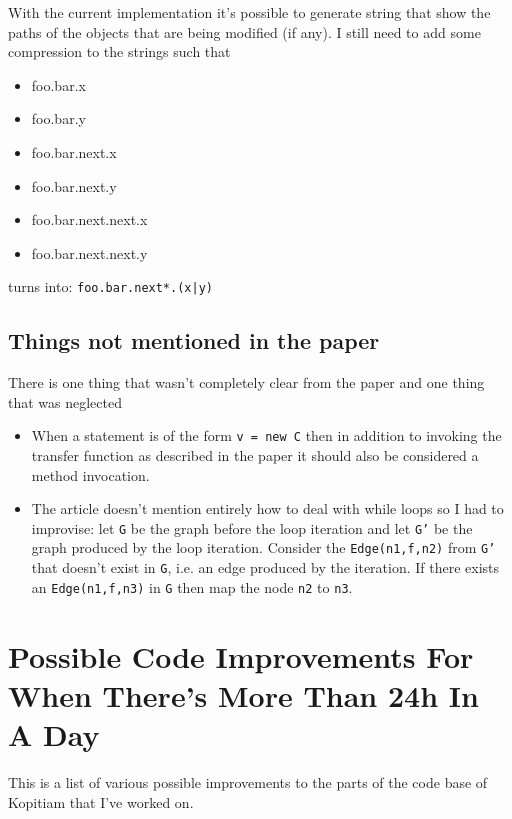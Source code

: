 \documentclass[11pt]{exam}
\begin{document}
With the current implementation it's possible to generate string that
show the paths of the objects that are being modified (if any). I
still need to add some compression to the strings such that

\begin{itemize}
  \setlength{\itemsep}{1pt}
  \setlength{\parskip}{0pt}
  \item foo.bar.x
  \item foo.bar.y
  \item foo.bar.next.x
  \item foo.bar.next.y
  \item foo.bar.next.next.x
  \item foo.bar.next.next.y
\end{itemize}

turns into: \texttt{foo.bar.next*.(x|y)}

\subsection{Things not mentioned in the paper}

There is one thing that wasn't completely clear from the paper and one
thing that was neglected

\begin{itemize}
  \item When a statement is of the form \texttt{v = new C} then in 
        addition to invoking the transfer function as described in 
        the paper it should also be considered a method invocation.
  \item The article doesn't mention entirely how to deal with while loops 
        so I had to improvise: let \texttt{G} be the graph before the loop 
        iteration and let \texttt{G'} be the graph produced by the loop 
        iteration. Consider the \texttt{Edge(n1,f,n2)} from \texttt{G'} 
        that doesn't exist in \texttt{G}, i.e. an edge produced by the 
        iteration. If there exists an \texttt{Edge(n1,f,n3)} in \texttt{G} 
        then map the node \texttt{n2} to \texttt{n3}.
\end{itemize}

\newpage

\section{Possible Code Improvements For When There's More Than 24h In A Day}

This is a list of various possible improvements to the parts of the
code base of Kopitiam that I've worked on.
\end{document}
